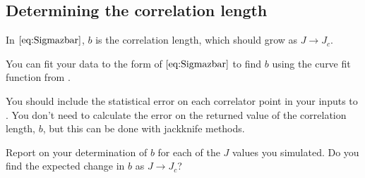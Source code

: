 \subsection{Determining the correlation length}

In \(\eqref{eq:Sigmazbar}\), \(b\) is the correlation length, which should grow as
\(J \rightarrow J_c\).

\Question{} You can fit your data to the form of \(\eqref{eq:Sigmazbar}\) to find \(b\)
using the curve fit function  from
\href{https://github.com/JuliaNLSolvers/LsqFit.jl}{}.

You should include the statistical error on each correlator point in your inputs to
.
You don't need to calculate the error on the returned value of the correlation length,
\(b\), but this can be done with jackknife methods.


\Question{} Report on your determination of \(b\) for each of the \(J\) values you
simulated. Do you find the expected change in \(b\) as \(J \rightarrow J_c\)?
